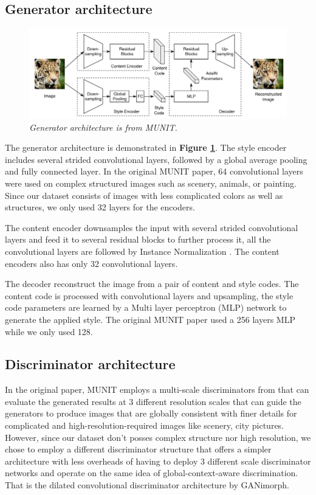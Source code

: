 \documentclass[12pt]{report}
\begin{document}
\subsection{Generator architecture}
\begin{figure}[h]
	\centering
	\includegraphics[scale=0.8]{gen-architecture}
	\caption{\textit{Generator architecture is from MUNIT\cite{munit}.}}
	\label{fig:gen-architecture}
\end{figure}
The generator architecture is demonstrated in \textbf{Figure \ref{fig:gen-architecture}}. The style encoder includes several strided convolutional layers, followed by a global average pooling and fully connected layer. In the original MUNIT paper\cite{munit}, 64 convolutional layers were used on complex structured images such as scenery, animals, or painting. Since our dataset consists of images with less complicated colors as well as structures, we only used 32 layers for the encoders.

The content encoder downsamples the input with several strided convolutional layers and feed it to several residual blocks \cite{resnet} to further process it, all the convolutional layers are followed by Instance Normalization \cite{instance-norm}. The content encoders also has only 32 convolutional layers.

The decoder reconstruct the image from a pair of content and style codes. The content code is processed with convolutional layers and upsampling, the style code parameters are learned by a Multi layer perceptron (MLP) \cite{mlp} network to generate the applied style. The original MUNIT paper\cite{munit} used a 256 layers MLP while we only used 128.


\subsection{Discriminator architecture}

In the original paper, MUNIT \cite{munit} employs a multi-scale discriminators from \cite{multi-scale-discri} that can evaluate the generated results at 3 different resolution scales that can guide the generators to produce images that are globally consistent with finer details for complicated and high-resolution-required images like scenery, city pictures. However, since our dataset don't posses complex structure nor high resolution, we chose to employ a different discriminator structure that offers a simpler architecture with less overheads of having to deploy 3 different scale discriminator networks and operate on the same idea of global-context-aware discrimination. That is the dilated convolutional discriminator architecture by GANimorph\cite{ganimorph}. 
\end{document}

